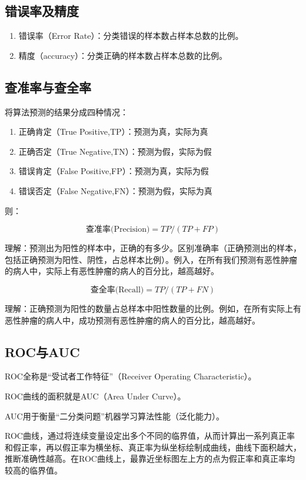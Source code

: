 \subsection{错误率及精度}

\begin{enumerate}
\itemsep0em 
\item 错误率（Error Rate）：分类错误的样本数占样本总数的比例。
\item 精度（accuracy）：分类正确的样本数占样本总数的比例。
\end{enumerate}


\subsection{查准率与查全率}

将算法预测的结果分成四种情况： 

\begin{enumerate}
	\itemsep0em 
	\item 正确肯定（True Positive,TP）：预测为真，实际为真 
	\item 正确否定（True Negative,TN）：预测为假，实际为假 
	\item 错误肯定（False Positive,FP）：预测为真，实际为假 
	\item 错误否定（False Negative,FN）：预测为假，实际为真
\end{enumerate}


则： 

$$
\mbox{查准率(Precision)}=TP/(TP+FP)
$$

理解：预测出为阳性的样本中，正确的有多少。区别准确率（正确预测出的样本，包括正确预测为阳性、阴性，占总样本比例）。例入，在所有我们预测有恶性肿瘤的病人中，实际上有恶性肿瘤的病人的百分比，越高越好。 

$$
\mbox{查全率(Recall)}=TP/(TP+FN)
$$

理解：正确预测为阳性的数量占总样本中阳性数量的比例。例如，在所有实际上有恶性肿瘤的病人中，成功预测有恶性肿瘤的病人的百分比，越高越好。

\subsection{ROC与AUC}

ROC全称是``受试者工作特征''（Receiver Operating Characteristic）。

ROC曲线的面积就是AUC（Area Under Curve）。

AUC用于衡量“二分类问题”机器学习算法性能（泛化能力）。

ROC曲线，通过将连续变量设定出多个不同的临界值，从而计算出一系列真正率和假正率，再以假正率为横坐标、真正率为纵坐标绘制成曲线，曲线下面积越大，推断准确性越高。在ROC曲线上，最靠近坐标图左上方的点为假正率和真正率均较高的临界值。 

